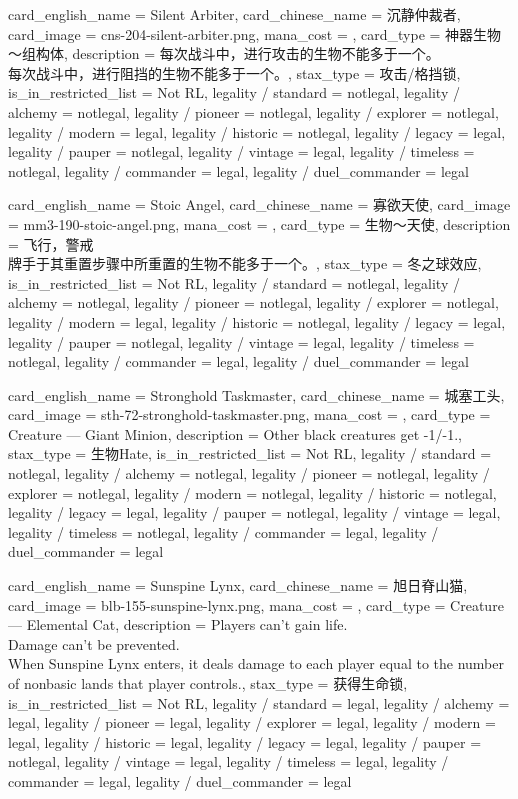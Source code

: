 \documentclass[lang = cn, color = black, 10pt]{AllThatStax}
\begin{document}
\card
{
	card_english_name = {Silent Arbiter},
	card_chinese_name = {沉静仲裁者},
	card_image = cns-204-silent-arbiter.png,
	mana_cost = ,
	card_type = 神器生物～组构体,
	description = {每次战斗中，进行攻击的生物不能多于一个。\\
		每次战斗中，进行阻挡的生物不能多于一个。},
	stax_type = 攻击/格挡锁,
	is_in_restricted_list = Not RL,
	legality / standard = notlegal,
	legality / alchemy = notlegal,
	legality / pioneer = notlegal,
	legality / explorer = notlegal,
	legality / modern = legal,
	legality / historic = notlegal,
	legality / legacy = legal,
	legality / pauper = notlegal,
	legality / vintage = legal,
	legality / timeless = notlegal,
	legality / commander = legal,
	legality / duel_commander = legal
}

\card
{
	card_english_name = {Stoic Angel},
	card_chinese_name = {寡欲天使},
	card_image = mm3-190-stoic-angel.png,
	mana_cost = ,
	card_type = 生物～天使,
	description = {飞行，警戒\\
		牌手于其重置步骤中所重置的生物不能多于一个。},
	stax_type = 冬之球效应,
	is_in_restricted_list = Not RL,
	legality / standard = notlegal,
	legality / alchemy = notlegal,
	legality / pioneer = notlegal,
	legality / explorer = notlegal,
	legality / modern = legal,
	legality / historic = notlegal,
	legality / legacy = legal,
	legality / pauper = notlegal,
	legality / vintage = legal,
	legality / timeless = notlegal,
	legality / commander = legal,
	legality / duel_commander = legal
}

\card
{
	card_english_name = {Stronghold Taskmaster},
	card_chinese_name = {城塞工头},
	card_image = sth-72-stronghold-taskmaster.png,
	mana_cost = ,
	card_type = Creature — Giant Minion,
	description = {Other black creatures get -1/-1.},
	stax_type = 生物Hate,
	is_in_restricted_list = Not RL,
	legality / standard = notlegal,
	legality / alchemy = notlegal,
	legality / pioneer = notlegal,
	legality / explorer = notlegal,
	legality / modern = notlegal,
	legality / historic = notlegal,
	legality / legacy = legal,
	legality / pauper = notlegal,
	legality / vintage = legal,
	legality / timeless = notlegal,
	legality / commander = legal,
	legality / duel_commander = legal
}

\card
{
	card_english_name = {Sunspine Lynx},
	card_chinese_name = {旭日脊山猫},
	card_image = blb-155-sunspine-lynx.png,
	mana_cost = ,
	card_type = Creature — Elemental Cat,
	description = {Players can't gain life.\\
		Damage can't be prevented.\\
		When Sunspine Lynx enters, it deals damage to each player equal to the number of nonbasic lands that player controls.},
	stax_type = 获得生命锁,
	is_in_restricted_list = Not RL,
	legality / standard = legal,
	legality / alchemy = legal,
	legality / pioneer = legal,
	legality / explorer = legal,
	legality / modern = legal,
	legality / historic = legal,
	legality / legacy = legal,
	legality / pauper = notlegal,
	legality / vintage = legal,
	legality / timeless = legal,
	legality / commander = legal,
	legality / duel_commander = legal
}
\end{document}
